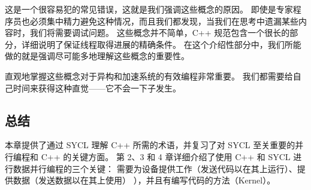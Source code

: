 这是一个很容易犯的常见错误，这就是我们强调这些概念的原因。 
即使是专家程序员也必须集中精力避免这种情况，而且我们都发现，当我们在思考中遗漏某些内容时，我们将需要调试问题。 
这些概念并不简单，C++ 规范包含一个很长的部分，详细说明了保证线程取得进展的精确条件。 
在这个介绍性部分中，我们所能做的就是强调尽可能多地理解这些概念的重要性。

直观地掌握这些概念对于异构和加速系统的有效编程非常重要。 我们都需要给自己时间来获得这种直觉——它不会一下子发生。

\subsection{总结}
本章提供了通过 SYCL 理解 C++ 所需的术语，并复习了对 SYCL 至关重要的并行编程和 C++ 的关键方面。 
第 2、3 和 4 章详细介绍了使用 C++ 和 SYCL 进行数据并行编程的三个关键：
需要为设备提供工作（发送代码以在其上运行）、提供数据（发送数据以在其上使用） ），并且有编写代码的方法（Kernel）。